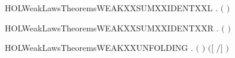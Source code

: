 \begin{SaveVerbatim}{HOLWeakLawsTheoremsWEAKXXSUMXXIDENTXXL}
\HOLTokenTurnstile{} \HOLSymConst{\HOLTokenForall{}}.  \ensuremath{(} \HOLSymConst{\ensuremath{+}} \ensuremath{)} 
\end{SaveVerbatim}
\newcommand{\HOLWeakLawsTheoremsWEAKXXSUMXXIDENTXXL}{\UseVerbatim{HOLWeakLawsTheoremsWEAKXXSUMXXIDENTXXL}}
\begin{SaveVerbatim}{HOLWeakLawsTheoremsWEAKXXSUMXXIDENTXXR}
\HOLTokenTurnstile{} \HOLSymConst{\HOLTokenForall{}}.  \ensuremath{(} \HOLSymConst{\ensuremath{+}} \ensuremath{)} 
\end{SaveVerbatim}
\newcommand{\HOLWeakLawsTheoremsWEAKXXSUMXXIDENTXXR}{\UseVerbatim{HOLWeakLawsTheoremsWEAKXXSUMXXIDENTXXR}}
\begin{SaveVerbatim}{HOLWeakLawsTheoremsWEAKXXUNFOLDING}
\HOLTokenTurnstile{} \HOLSymConst{\HOLTokenForall{}} .  \ensuremath{(}  \ensuremath{)} \ensuremath{(}\ensuremath{[}  \ensuremath{/}\ensuremath{]} \ensuremath{)}
\end{SaveVerbatim}
\newcommand{\HOLWeakLawsTheoremsWEAKXXUNFOLDING}{\UseVerbatim{HOLWeakLawsTheoremsWEAKXXUNFOLDING}}
